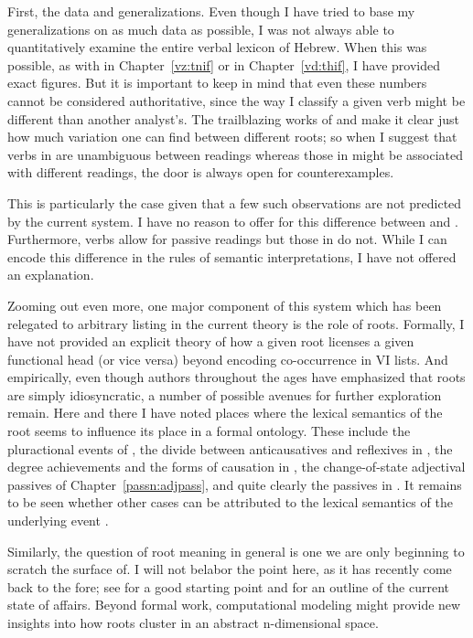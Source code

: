 First, the data and generalizations. Even though I have tried to base my generalizations on as much data as possible, I was not always able to quantitatively examine the entire verbal lexicon of Hebrew. When this was possible, as with {\tnif} in Chapter~\ref{vz:tnif} or {\thif} in Chapter~\ref{vd:thif}, I have provided exact figures. But it is important to keep in mind that even these numbers cannot be considered authoritative, since the way I classify a given verb might be different than another analyst's. The trailblazing works of \cite{doron03} and \cite{arad05} make it clear just how much variation one can find between different roots; so when I suggest that verbs in {\thit} are unambiguous between readings whereas those in {\tnif} might be associated with different readings, the door is always open for counterexamples.

This is particularly the case given that a few such observations are not predicted by the current system. I have no reason to offer for this difference between {\thit} and {\tnif}. Furthermore, {\tnif} verbs allow for passive readings but those in {\thit} do not. While I can encode this difference in the rules of semantic interpretations, I have not offered an explanation.

\label{r1:6:4}Zooming out even more, one major component of this system which has been relegated to arbitrary listing in the current theory is the role of roots. Formally, I have not provided an explicit theory of how a given root licenses a given functional head (or vice versa) beyond encoding co-occurrence in VI lists. And empirically, even though authors throughout the ages have emphasized that roots are simply idiosyncratic, a number of possible avenues for further exploration remain. Here and there I have noted places where the lexical semantics of the root seems to influence its place in a formal ontology. These include the pluractional events of {\tpie}, the divide between anticausatives and reflexives in {\thit}, the degree achievements and the forms of causation in {\thif}, the change-of-state adjectival passives of Chapter~\ref{passn:adjpass}, and quite clearly the passives in {\tnif}. It remains to be seen whether other cases can be attributed to the lexical semantics of the underlying event  \citep[114]{kastner16phd}.

Similarly, the question of root meaning in general is one we are only beginning to scratch the surface of. I will not belabor the point here, as it has recently come back to the fore; see \cite{harley14thlia} for a good starting point and \cite{kastnertucker19cup} for an outline of the current state of affairs.
Beyond formal work, computational modeling might provide new insights into how roots cluster in an abstract n-dimensional space.

